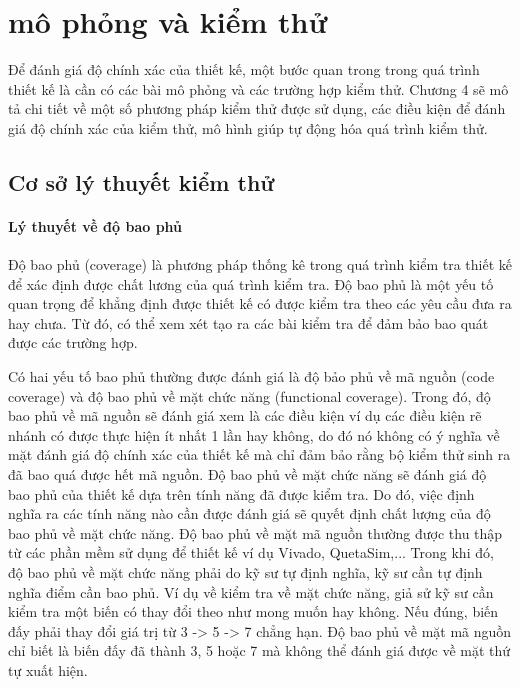 \clearpage
{}

\setcounter{chapter}{3}
\chapter[{MÔ PHỎNG VÀ KIỂM THỬ}]{mô phỏng và kiểm thử}
Để đánh giá độ chính xác của thiết kế, một bước quan trong trong quá trình thiết kế là cần có các bài mô phỏng và các trường hợp kiểm thử. Chương 4 sẽ mô tả chi tiết về một số phương pháp kiểm thử được sử dụng, các điều kiện để đánh giá độ chính xác của kiểm thử, mô hình giúp tự động hóa quá trình kiểm thử.
\section{Cơ sở lý thuyết kiểm thử}
\subsubsection{Lý thuyết về độ bao phủ}
Độ bao phủ (coverage) là phương pháp thống kê trong quá trình kiểm tra thiết kế để xác định được chất lương của quá trình kiểm tra. Độ bao phủ là một yếu tố quan trọng để khẳng định được thiết kế có được kiểm tra theo các yêu cầu đưa ra hay chưa. Từ đó, có thể xem xét tạo ra các bài kiểm tra để đảm bảo bao quát được các trường hợp.

Có hai yếu tố bao phủ thường được đánh giá là độ bảo phủ về mã nguồn (code coverage) và độ bao phủ về mặt chức năng (functional coverage). Trong đó, độ bao phủ về mã nguồn sẽ đánh giá xem là các điều kiện ví dụ các điều kiện rẽ nhánh có được thực hiện ít nhất 1 lần hay không, do đó nó không có ý nghĩa về mặt đánh giá độ chính xác của thiết kế mà chỉ đảm bảo rằng bộ kiểm thử sinh ra đã bao quá được hết mã nguồn. Độ bao phủ về mặt chức năng sẽ đánh giá độ bao phủ của thiết kế dựa trên tính năng đã được kiểm tra. Do đó, việc định nghĩa ra các tính năng nào cần được đánh giá sẽ quyết định chất lượng của độ bao phủ về mặt chức năng. Độ bao phủ về mặt mã nguồn thường được thu thập từ các phần mềm sử dụng để thiết kế ví dụ Vivado, QuetaSim,... Trong khi đó, độ bao phủ về mặt chức năng phải do kỹ sư tự định nghĩa, kỹ sư cần tự định nghĩa điểm cần bao phủ. Ví dụ về kiểm tra về mặt chức năng, giả sử kỹ sư cần kiểm tra một biến có thay đổi theo như mong muốn hay không. Nếu đúng, biến đấy phải thay đổi giá trị từ 3 -> 5 -> 7 chẳng hạn. Độ bao phủ về mặt mã nguồn chỉ biết là biến đấy đã thành 3, 5 hoặc 7 mà không thể đánh giá được về mặt thứ tự xuất hiện.

